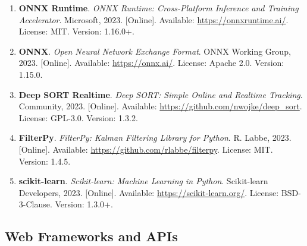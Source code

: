 \begin{enumerate}
    \item \textbf{ONNX Runtime}. \textit{ONNX Runtime: Cross-Platform Inference and Training Accelerator}. 
    Microsoft, 2023. [Online]. Available: \url{https://onnxruntime.ai/}. 
    License: MIT. Version: 1.16.0+.
    
    \item \textbf{ONNX}. \textit{Open Neural Network Exchange Format}. 
    ONNX Working Group, 2023. [Online]. Available: \url{https://onnx.ai/}. 
    License: Apache 2.0. Version: 1.15.0.
    
    \item \textbf{Deep SORT Realtime}. \textit{Deep SORT: Simple Online and Realtime Tracking}. 
    Community, 2023. [Online]. Available: \url{https://github.com/nwojke/deep_sort}. 
    License: GPL-3.0. Version: 1.3.2.
    
    \item \textbf{FilterPy}. \textit{FilterPy: Kalman Filtering Library for Python}. 
    R. Labbe, 2023. [Online]. Available: \url{https://github.com/rlabbe/filterpy}. 
    License: MIT. Version: 1.4.5.
    
    \item \textbf{scikit-learn}. \textit{Scikit-learn: Machine Learning in Python}. 
    Scikit-learn Developers, 2023. [Online]. Available: \url{https://scikit-learn.org/}. 
    License: BSD-3-Clause. Version: 1.3.0+.
\end{enumerate}

\subsection*{Web Frameworks and APIs}

